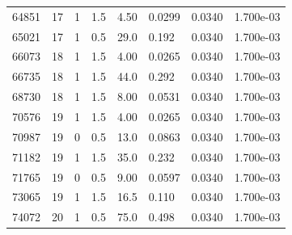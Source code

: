 \documentclass[preview]{standalone}
\begin{document}
{{{\begin{tabular}{L{1.2cm}C{1.2cm} C{0.3cm}C{0.5cm} C{1.4cm}C{1.4cm} C{1.4cm}C{1.4cm}}
  64851  &    17  & 1     & 1.5 &  4.50  & 0.0299  & 0.0340 &  1.700e-03   \\ 
  65021  &    17  & 1     & 0.5 &  29.0  & 0.192  & 0.0340 &  1.700e-03   \\ 
  66073  &    18  & 1     & 1.5 &  4.00  & 0.0265  & 0.0340 &  1.700e-03   \\ 
  66735  &    18  & 1     & 1.5 &  44.0  & 0.292  & 0.0340 &  1.700e-03   \\ 
  68730  &    18  & 1     & 1.5 &  8.00  & 0.0531  & 0.0340 &  1.700e-03   \\ 
  70576  &    19  & 1     & 1.5 &  4.00  & 0.0265  & 0.0340 &  1.700e-03   \\ 
  70987  &    19  & 0     & 0.5 &  13.0  & 0.0863  & 0.0340 &  1.700e-03   \\ 
  71182  &    19  & 1     & 1.5 &  35.0  & 0.232  & 0.0340 &  1.700e-03   \\ 
  71765  &    19  & 0     & 0.5 &  9.00  & 0.0597  & 0.0340 &  1.700e-03   \\ 
  73065  &    19  & 1     & 1.5 &  16.5  & 0.110  & 0.0340 &  1.700e-03   \\ 
  74072  &    20  & 1     & 0.5 &  75.0  & 0.498  & 0.0340 &  1.700e-03   \\ 
\hline 
\end{tabular} 

}}}
\end{document}

